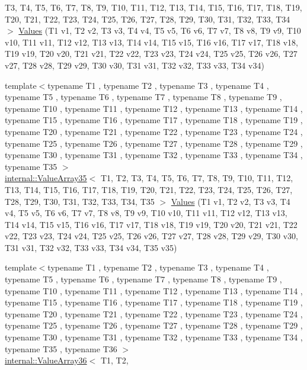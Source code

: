 \begin{DoxyCompactItemize}
\-T3, \-T4, \-T5, \-T6, \-T7, \-T8, \-T9, \*
\-T10, \-T11, \-T12, \-T13, \-T14, \-T15, \*
\-T16, \-T17, \-T18, \-T19, \-T20, \-T21, \*
\-T22, \-T23, \-T24, \-T25, \-T26, \-T27, \*
\-T28, \-T29, \-T30, \-T31, \-T32, \-T33, \*
\-T34 $>$ \hyperlink{namespacetesting_a37ae9a0b15ed1e02fda22769ef76c97e}{\-Values} (\-T1 v1, \-T2 v2, \-T3 v3, \-T4 v4, \-T5 v5, \-T6 v6, \-T7 v7, \-T8 v8, \-T9 v9, \-T10 v10, \-T11 v11, \-T12 v12, \-T13 v13, \-T14 v14, \-T15 v15, \-T16 v16, \-T17 v17, \-T18 v18, \-T19 v19, \-T20 v20, \-T21 v21, \-T22 v22, \-T23 v23, \-T24 v24, \-T25 v25, \-T26 v26, \-T27 v27, \-T28 v28, \-T29 v29, \-T30 v30, \-T31 v31, \-T32 v32, \-T33 v33, \-T34 v34)
\item 
{\footnotesize template$<$typename T1 , typename T2 , typename T3 , typename T4 , typename T5 , typename T6 , typename T7 , typename T8 , typename T9 , typename T10 , typename T11 , typename T12 , typename T13 , typename T14 , typename T15 , typename T16 , typename T17 , typename T18 , typename T19 , typename T20 , typename T21 , typename T22 , typename T23 , typename T24 , typename T25 , typename T26 , typename T27 , typename T28 , typename T29 , typename T30 , typename T31 , typename T32 , typename T33 , typename T34 , typename T35 $>$ }\\\hyperlink{classtesting_1_1internal_1_1ValueArray35}{internal\-::\-Value\-Array35}$<$ \-T1, \-T2, \*
\-T3, \-T4, \-T5, \-T6, \-T7, \-T8, \-T9, \*
\-T10, \-T11, \-T12, \-T13, \-T14, \-T15, \*
\-T16, \-T17, \-T18, \-T19, \-T20, \-T21, \*
\-T22, \-T23, \-T24, \-T25, \-T26, \-T27, \*
\-T28, \-T29, \-T30, \-T31, \-T32, \-T33, \*
\-T34, \-T35 $>$ \hyperlink{namespacetesting_a8746425c9d27e46ea5bc5fd77586bc2a}{\-Values} (\-T1 v1, \-T2 v2, \-T3 v3, \-T4 v4, \-T5 v5, \-T6 v6, \-T7 v7, \-T8 v8, \-T9 v9, \-T10 v10, \-T11 v11, \-T12 v12, \-T13 v13, \-T14 v14, \-T15 v15, \-T16 v16, \-T17 v17, \-T18 v18, \-T19 v19, \-T20 v20, \-T21 v21, \-T22 v22, \-T23 v23, \-T24 v24, \-T25 v25, \-T26 v26, \-T27 v27, \-T28 v28, \-T29 v29, \-T30 v30, \-T31 v31, \-T32 v32, \-T33 v33, \-T34 v34, \-T35 v35)
\item 
{\footnotesize template$<$typename T1 , typename T2 , typename T3 , typename T4 , typename T5 , typename T6 , typename T7 , typename T8 , typename T9 , typename T10 , typename T11 , typename T12 , typename T13 , typename T14 , typename T15 , typename T16 , typename T17 , typename T18 , typename T19 , typename T20 , typename T21 , typename T22 , typename T23 , typename T24 , typename T25 , typename T26 , typename T27 , typename T28 , typename T29 , typename T30 , typename T31 , typename T32 , typename T33 , typename T34 , typename T35 , typename T36 $>$ }\\\hyperlink{classtesting_1_1internal_1_1ValueArray36}{internal\-::\-Value\-Array36}$<$ \-T1, \-T2, \*

\end{DoxyCompactItemize}
